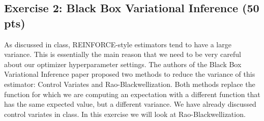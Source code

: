 \documentclass [12pt]{article}
\begin{document}
\subsection*{Exercise 2: Black Box Variational Inference (50 pts)}

As discussed in class, REINFORCE-style estimators tend to have a large variance. This is essentially the main reason
that we need to be very careful about our optimizer hyperparameter settings. The authors of the Black Box Variational
Inference paper proposed two methods to reduce the variance of this estimator: Control Variates and
Rao-Blackwellization. Both methods replace the function for which we are computing an expectation with a different
function that has the same expected value, but a different variance. We have already discussed control variates in
class. In this exercise we will look at Rao-Blackwellization.
\end{document}
